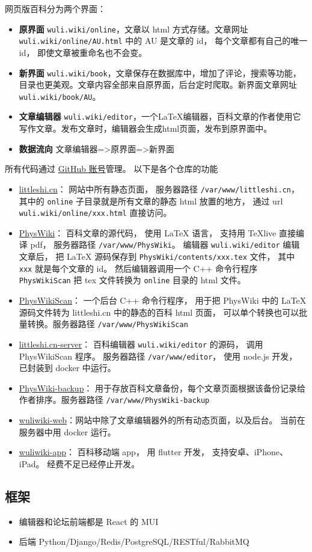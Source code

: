 
网页版百科分为两个界面：
\begin{itemize}
\item \textbf{原界面} \verb|wuli.wiki/online|，文章以 html 方式存储。文章网址 \verb|wuli.wiki/online/AU.html| 中的 AU 是文章的 id， 每个文章都有自己的唯一 id， 即使文章被重命名也不会变。  
\item \textbf{新界面} \verb|wuli.wiki/book|，文章保存在数据库中，增加了评论，搜索等功能，目录也更美观。文章内容全部来自原界面，后台定时爬取。新界面文章网址 \verb|wuli.wiki/book/AU|。
\item \textbf{文章编辑器} \verb|wuli.wiki/editor|，一个LaTeX编辑器，百科文章的作者使用它写作文章。发布文章时，编辑器会生成html页面，发布到原界面中。
\item \textbf{数据流向} 文章编辑器=>原界面=>新界面
\end{itemize}


所有代码通过 \href{https://github.com/wuliwiki}{GitHub 账号}管理。 以下是各个仓库的功能
\begin{itemize}
\item \href{https://github.com/MacroUniverse/littleshi.cn}{littleshi.cn}： 网站中所有静态页面， 服务器路径 \verb|/var/www/littleshi.cn|， 其中的 \verb`online` 子目录就是所有文章的静态 html 放置的地方， 通过 url \verb`wuli.wiki/online/xxx.html` 直接访问。
\item \href{https://github.com/MacroUniverse/PhysWiki}{PhysWiki}： 百科文章的源代码， 使用 LaTeX 语言， 支持用 TeXlive 直接编译 pdf， 服务器路径 \verb|/var/www/PhysWiki|。 编辑器 \verb`wuli.wiki/editor` 编辑文章后， 把 LaTeX 源码保存到 \verb`PhysWiki/contents/xxx.tex` 文件， 其中 \verb`xxx` 就是每个文章的 id。 然后编辑器调用一个 C++ 命令行程序 \verb`PhysWikiScan` 把 tex 文件转换为 \verb`online` 目录的 html 文件。
\item \href{https://github.com/MacroUniverse/PhysWikiScan}{PhysWikiScan}： 一个后台 C++ 命令行程序， 用于把 PhysWiki 中的 LaTeX 源码文件转为 littleshi.cn 中的静态的百科 html 页面， 可以单个转换也可以批量转换。服务器路径 \verb|/var/www/PhysWikiScan|
\item \href{https://github.com/MacroUniverse/littleshi.cn-server}{littleshi.cn-server}： 百科编辑器 \verb`wuli.wiki/editor` 的源码， 调用 PhysWikiScan 程序。 服务器路径 \verb|/var/www/editor|， 使用 node.js 开发， 已封装到 docker 中运行。
\item \href{https://github.com/MacroUniverse/PhysWiki-backup}{PhysWiki-backup}： 用于存放百科文章备份，每个文章页面根据该备份记录给作者排序。服务器路径 \verb|/var/www/PhysWiki-backup|
\item \href{https://github.com/MacroUniverse/wuliwiki-web}{wuliwiki-web}：网站中除了文章编辑器外的所有动态页面，以及后台。 当前在服务器中用 docker 运行。
\item \href{https://github.com/MacroUniverse/wuliwiki-app}{wuliwiki-app}： 百科移动端 app， 用 flutter 开发， 支持安卓、iPhone、iPad。 经费不足已经停止开发。
\end{itemize}

\subsection{框架}
\begin{itemize}
\item 编辑器和论坛前端都是 React 的 MUI
\item 后端 Python/Django/Redis/PostgreSQL/RESTful/RabbitMQ
\end{itemize}
